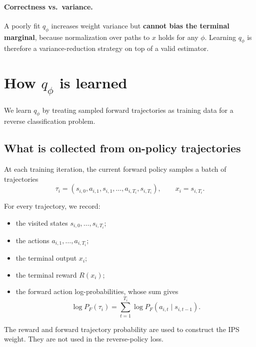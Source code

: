 \documentclass[11pt]{article}
\newcommand{\PF}{P_F}
\newcommand{\qphi}{q_\phi}
\newcommand{\R}{R}
\begin{document}
\paragraph{Correctness vs.\ variance.}
A poorly fit \(\qphi\) increases weight variance but \textbf{cannot bias the terminal marginal}, because normalization over paths to \(x\) holds for any \(\phi\). Learning \(\qphi\) is therefore a variance-reduction strategy on top of a valid estimator.

\section{How \(\qphi\) is learned}
\label{sec:learning}

We learn \(\qphi\) by treating sampled forward trajectories as training data for a reverse classification problem.

\subsection{What is collected from on-policy trajectories}

At each training iteration, the current forward policy samples a batch of trajectories
\begin{equation}
    \tau_i
    =
    (s_{i,0},a_{i,1},s_{i,1},\ldots,a_{i,T_i},s_{i,T_i}),
    \qquad
    x_i=s_{i,T_i}.
\end{equation}

For every trajectory, we record:
\begin{itemize}
    \item the visited states \(s_{i,0},\ldots,s_{i,T_i}\);
    \item the actions \(a_{i,1},\ldots,a_{i,T_i}\);
    \item the terminal output \(x_i\);
    \item the terminal reward \(\R(x_i)\);
    \item the forward action log-probabilities, whose sum gives
    \begin{equation}
        \log \PF(\tau_i)
        =
        \sum_{t=1}^{T_i}
        \log \PF(a_{i,t}\mid s_{i,t-1}).
    \end{equation}
\end{itemize}

The reward and forward trajectory probability are used to construct the IPS weight. They are not used in the reverse-policy loss.
\end{document}
